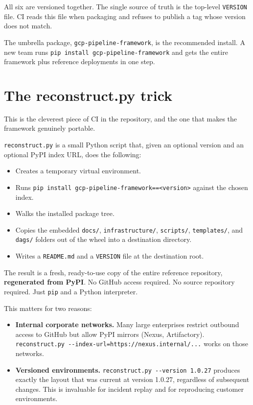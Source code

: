 \documentclass[
  11pt,
  british,
  oneside]{book}
\providecommand{\tightlist}{%
  \setlength{\itemsep}{0pt}\setlength{\parskip}{0pt}}
\begin{document}
All six are versioned together. The single source of truth is the
top-level \texttt{VERSION} file. CI reads this file when packaging and
refuses to publish a tag whose version does not match.

The umbrella package, \texttt{gcp-pipeline-framework}, is the
recommended install. A new team runs
\texttt{pip\ install\ gcp-pipeline-framework} and gets the entire
framework plus reference deployments in one step.

\hypertarget{the-reconstruct.py-trick}{%
\section{The reconstruct.py trick}\label{the-reconstruct.py-trick}}

This is the cleverest piece of CI in the repository, and the one that
makes the framework genuinely portable.

\texttt{reconstruct.py} is a small Python script that, given an optional
version and an optional PyPI index URL, does the following:

\begin{itemize}
\tightlist
\item
  Creates a temporary virtual environment.
\item
  Runs
  \texttt{pip\ install\ gcp-pipeline-framework==\textless{}version\textgreater{}}
  against the chosen index.
\item
  Walks the installed package tree.
\item
  Copies the embedded \texttt{docs/}, \texttt{infrastructure/},
  \texttt{scripts/}, \texttt{templates/}, and \texttt{dags/} folders out
  of the wheel into a destination directory.
\item
  Writes a \texttt{README.md} and a \texttt{VERSION} file at the
  destination root.
\end{itemize}

The result is a fresh, ready-to-use copy of the entire reference
repository, \textbf{regenerated from PyPI}. No GitHub access required.
No source repository required. Just \texttt{pip} and a Python
interpreter.

This matters for two reasons:

\begin{itemize}
\tightlist
\item
  \textbf{Internal corporate networks.} Many large enterprises restrict
  outbound access to GitHub but allow PyPI mirrors (Nexus, Artifactory).
  \texttt{reconstruct.py\ -\/-index-url=https://nexus.internal/...}
  works on those networks.
\item
  \textbf{Versioned environments.}
  \texttt{reconstruct.py\ -\/-version\ 1.0.27} produces exactly the
  layout that was current at version 1.0.27, regardless of subsequent
  changes. This is invaluable for incident replay and for reproducing
  customer environments.
\end{itemize}
\end{document}
